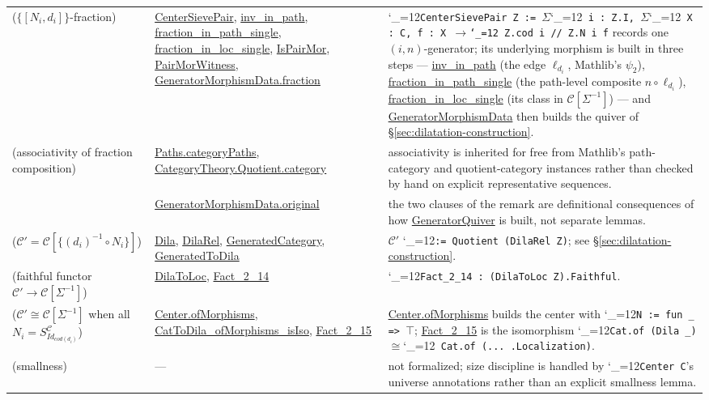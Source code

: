 \documentclass[11pt]{amsart}
\newcommand{\lc}[1]{\url{#1}}
\newcommand{\lcode}{\begingroup\catcode`\_=12\relax\lcodeInner}
\newcommand{\lcodeInner}[1]{\texttt{#1}\endgroup}
\theoremstyle{plain}
\theoremstyle{definition}
\theoremstyle{remark}
\newcommand{\calC}{\mathcal C}
\begin{document}
\begin{longtable}{@{}p{2.55cm}p{4.1cm}p{4.75cm}@{}}
\citep[Definition~2.10]{Mayeux} ($\{[N_i,d_i]\}$-fraction) & \lc{CenterSievePair}, \lc{inv_in_path}, \lc{fraction_in_path_single}, \lc{fraction_in_loc_single}, \lc{IsPairMor}, \lc{PairMorWitness}, \lc{GeneratorMorphismData.fraction} & \lcode{CenterSievePair Z := }\ensuremath{\Sigma}\lcode{ i : Z.I, }\ensuremath{\Sigma}\lcode{ X : C, {f : X }\ensuremath{\longrightarrow}\lcode{ Z.cod i // Z.N i f}} records one $(i,n)$-generator; its underlying morphism is built in three steps --- \lc{inv_in_path} (the edge $\ell_{d_i}$, Mathlib's \ensuremath{\psi_2}), \lc{fraction_in_path_single} (the path-level composite $n \circ \ell_{d_i}$), \lc{fraction_in_loc_single} (its class in $\calC[\Sigma^{-1}]$) --- and \lc{GeneratorMorphismData} then builds the quiver of \S\ref{sec:dilatation-construction}. \\
\citep[Fact~2.11]{Mayeux} (associativity of fraction composition) & \lc{Paths.categoryPaths}, \lc{CategoryTheory.Quotient.category} & associativity is inherited for free from Mathlib's path-category and quotient-category instances rather than checked by hand on explicit representative sequences. \\
\citep[Remark~2.12]{Mayeux} & \lc{GeneratorMorphismData.original} & the two clauses of the remark are definitional consequences of how \lc{GeneratorQuiver} is built, not separate lemmas. \\
\citep[Definition~2.13]{Mayeux} ($\calC'=\calC[\{(d_i)^{-1}\circ N_i\}]$) & \lc{Dila}, \lc{DilaRel}, \lc{GeneratedCategory}, \lc{GeneratedToDila} & $\calC'$ \lcode{:= Quotient (DilaRel Z)}; see \S\ref{sec:dilatation-construction}. \\
\citep[Fact~2.14]{Mayeux} (faithful functor $\calC' \to \calC[\Sigma^{-1}]$) & \lc{DilaToLoc}, \lc{Fact_2_14} & \lcode{Fact_2_14 : (DilaToLoc Z).Faithful}. \\
\citep[Fact~2.15]{Mayeux} ($\calC' \cong \calC[\Sigma^{-1}]$ when all $N_i = S^\calC_{Id_{cod(d_i)}}$) & \lc{Center.ofMorphisms}, \lc{CatToDila_ofMorphisms_isIso}, \lc{Fact_2_15} & \lc{Center.ofMorphisms} builds the center with \lcode{N := fun _ => }\ensuremath{\top}; \lc{Fact_2_15} is the isomorphism \lcode{Cat.of (Dila _) }\ensuremath{\cong}\lcode{ Cat.of (... .Localization)}. \\
\citep[Corollary~2.16]{Mayeux} (smallness) & --- & not formalized; size discipline is handled by \lcode{Center C}'s universe annotations rather than an explicit smallness lemma. \\
\end{longtable}
\endgroup
\end{document}
